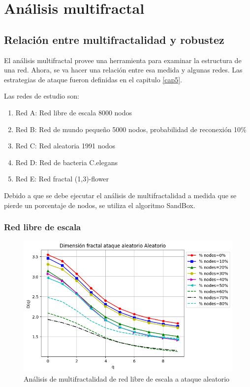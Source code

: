 \section{Análisis multifractal}

\subsection{Relación entre multifractalidad y robustez}

El análisis multifractal provee una herramienta para examinar la estructura de una red. Ahora, se va hacer una relación entre esa medida y algunas redes. Las estrategias de ataque fueron definidas en el capitulo \ref{cap5}.

Las redes de estudio son:

\begin{enumerate}
    \item Red A: Red libre de escala 8000 nodos
    \item Red B: Red de mundo pequeño 5000 nodos, probabilidad de reconexión 10\%
    \item Red C: Red aleatoria 1991 nodos
    \item Red D: Red de bacteria C.elegans
    \item Red E: Red fractal (1,3)-flower
\end{enumerate}

Debido a que se debe ejecutar el análisis de multifractalidad a medida que se pierde un porcentaje de nodos, se utiliza el algoritmo SandBox.

\subsubsection{Red libre de escala}

\begin{figure}[H]
    \centering
    \includegraphics[scale=0.7]{Capitulo6MultifractalidadYRobustez/imagenes/grafica_DqRandom20180512_143117ScaleFree8000Nodes.png}
    \caption{Análisis de multifractalidad de red libre de escala a ataque aleatorio }
\end{figure}

